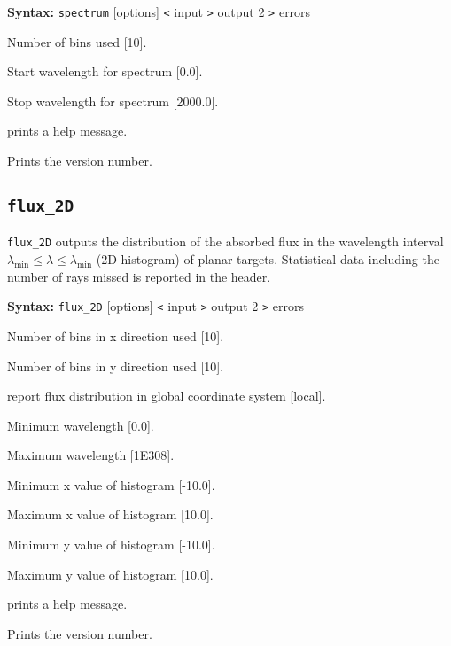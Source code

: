 \documentclass[10pt,a4paper,titlepage]{article}
\begin{document}
{\bf Syntax:} {\tt spectrum} [options] {\tt <} input {\tt >} output 2 {\tt >} errors
\vspace{1em}
\begin{list}{}
{\setlength{\leftmargin}{3.5cm}
\setlength{\labelwidth}{3.0cm}
\setlength{\labelsep}{0.25cm}
\setlength{\rightmargin}{0.5cm}}

\item[{\tt [--num|-n]}] Number of bins used [10].
\item[{\tt [--start|-a]}] Start wavelength for spectrum [0.0].
\item[{\tt [--stop|-o]}] Stop wavelength for spectrum [2000.0].
\item[{\tt [--help|-h]}] prints a help message.
\item[{\tt [--Version|-V]}] Prints the version number.

\end{list}

\subsection{{\tt flux\_2D}}
{\tt flux\_2D} outputs the distribution of the absorbed flux in the wavelength interval $ \lambda_\mathrm{min} \le \lambda \le \lambda_\mathrm{min}$ (2D histogram) of planar targets. Statistical data including the number of rays missed is reported in the header.

{\bf Syntax:} {\tt flux\_2D} [options] {\tt <} input {\tt >} output 2 {\tt >} errors
\vspace{1em}
\begin{list}{}
{\setlength{\leftmargin}{3.5cm}
\setlength{\labelwidth}{3.0cm}
\setlength{\labelsep}{0.25cm}
\setlength{\rightmargin}{0.5cm}}

\item[{\tt [--nx|-a]}] Number of bins in x direction used [10].
\item[{\tt [--ny|-b]}] Number of bins in y direction used [10].
\item[{\tt [--global|-g]}] report flux distribution in global coordinate system [local].
\item[{\tt [--minl|-l]}] Minimum wavelength [0.0].
\item[{\tt [--maxl|-L]}] Maximum wavelength [1E308].
\item[{\tt [--minx|-x]}] Minimum x value of histogram [-10.0].
\item[{\tt [--maxx|-X]}] Maximum x value of histogram [10.0].
\item[{\tt [--miny|-y]}] Minimum y value of histogram [-10.0].
\item[{\tt [--maxy|-Y]}] Maximum y value of histogram [10.0].
\item[{\tt [--help|-h]}] prints a help message.
\item[{\tt [--Version|-V]}] Prints the version number.

\end{list}
\end{document}
